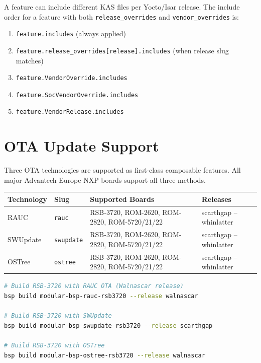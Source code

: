 \documentclass[a4paper,11pt]{article}
\begin{document}
A feature can include different KAS files per Yocto/Isar release. The include
order for a feature with both \texttt{release\_overrides} and
\texttt{vendor\_overrides} is:

\begin{enumerate}
  \item \texttt{feature.includes} (always applied)
  \item \texttt{feature.release\_overrides[release].includes} (when release slug matches)
  \item \texttt{feature.VendorOverride.includes}
  \item \texttt{feature.SocVendorOverride.includes}
  \item \texttt{feature.VendorRelease.includes}
\end{enumerate}

\section{OTA Update Support}

Three OTA technologies are supported as first-class composable features.
All major Advantech Europe NXP boards support all three methods.

\begin{tabularx}{\linewidth}{L{22mm}L{20mm}XL{35mm}}
  \textbf{Technology} & \textbf{Slug} & \textbf{Supported Boards} & \textbf{Releases} \\
  \toprule
   RAUC
    & \texttt{rauc}
    & RSB-3720, ROM-2620, ROM-2820, ROM-5720/21/22
    & scarthgap -- whinlatter \\
    SWUpdate
    & \texttt{swupdate}
    & RSB-3720, ROM-2620, ROM-2820, ROM-5720/21/22
    & scarthgap -- whinlatter \\
   OSTree
    & \texttt{ostree}
    & RSB-3720, ROM-2620, ROM-2820, ROM-5720/21/22
    & scarthgap -- whinlatter \\
  \bottomrule
\end{tabularx}

\begin{lstlisting}[language=Bash]
# Build RSB-3720 with RAUC OTA (Walnascar release)
bsp build modular-bsp-rauc-rsb3720 --release walnascar

# Build RSB-3720 with SWUpdate
bsp build modular-bsp-swupdate-rsb3720 --release scarthgap

# Build RSB-3720 with OSTree
bsp build modular-bsp-ostree-rsb3720 --release walnascar
\end{lstlisting}
\end{document}
